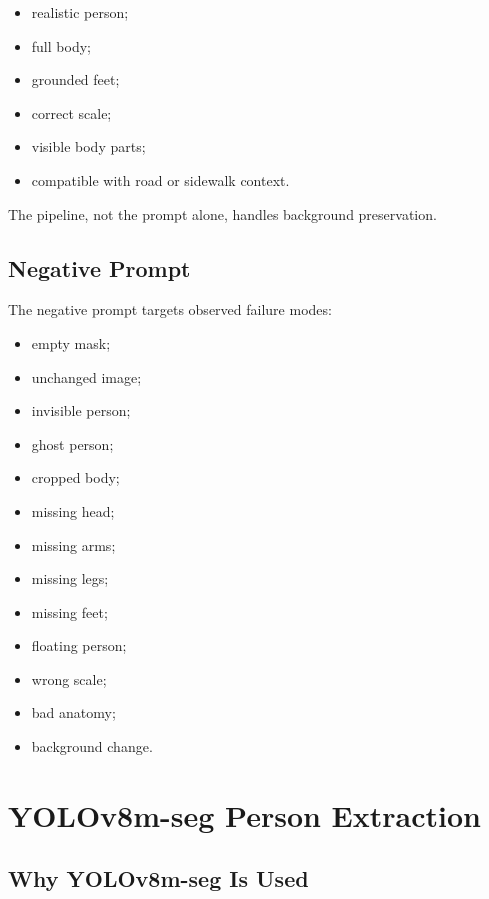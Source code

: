 \documentclass[12pt,a4paper]{article}
\begin{document}
\begin{itemize}
    \item realistic person;
    \item full body;
    \item grounded feet;
    \item correct scale;
    \item visible body parts;
    \item compatible with road or sidewalk context.
\end{itemize}

The pipeline, not the prompt alone, handles background preservation.

\subsection{Negative Prompt}

The negative prompt targets observed failure modes:

\begin{itemize}
    \item empty mask;
    \item unchanged image;
    \item invisible person;
    \item ghost person;
    \item cropped body;
    \item missing head;
    \item missing arms;
    \item missing legs;
    \item missing feet;
    \item floating person;
    \item wrong scale;
    \item bad anatomy;
    \item background change.
\end{itemize}

\section{YOLOv8m-seg Person Extraction}

\subsection{Why YOLOv8m-seg Is Used}
\end{document}
